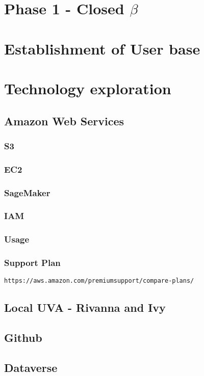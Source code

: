 \section{Phase 1 - Closed $\beta$}
\section{Establishment of User base}
\section{Technology exploration}

\subsection{Amazon Web Services}
\subsubsection{S3}
\subsubsection{EC2}
\subsubsection{SageMaker}
\subsubsection{IAM}
\subsubsection{Usage}
\subsubsection{Support Plan}
\begin{verbatim}
https://aws.amazon.com/premiumsupport/compare-plans/
\end{verbatim}

\subsection{Local UVA - Rivanna and Ivy}
\subsection{Github}
\subsection{Dataverse}